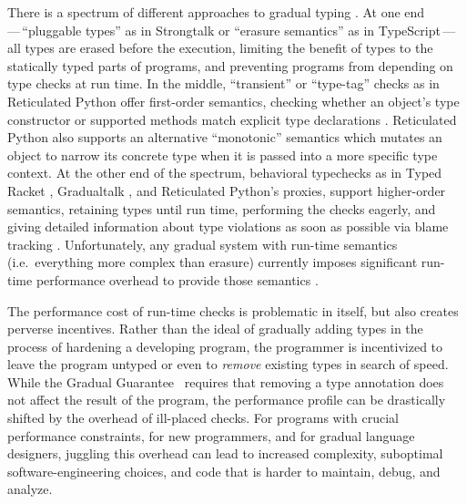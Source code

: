 There is a spectrum of different approaches to gradual typing
\cite{kafka18,bensurvey18icfp}.
At one end\,---\,``pluggable types'' as in Strongtalk \cite{strongtalk} or ``erasure
semantics'' as in 
TypeScript\citep{typeScriptECOOP}\,---\,
%
all types are erased before the execution, limiting the benefit of
types to the statically typed parts of programs, and preventing
programs from depending on type checks at run time.  In the middle,
``transient'' or ``type-tag'' checks as in Reticulated Python 
offer first-order semantics, checking
whether an object's type constructor or supported methods match
explicit type declarations
\cite{Siek2007,Bloom2009,concrete15,reticPython2014,Greenman2018}.
Reticulated Python also supports an alternative ``monotonic'' semantics
which mutates an object to narrow its concrete type when it is passed
into a more specific type context.
At the other end of the spectrum, behavioral
typechecks as in Typed Racket \cite{typedScheme08,takikawa2012},
Gradualtalk \cite{gradualtalk14},
and Reticulated Python's proxies,
support higher-order semantics, retaining
types until run 
time, performing the checks eagerly, and giving detailed information
about type violations as soon as possible via blame
tracking \cite{blame2009,blameForAll2011}.
%
%
Unfortunately, any gradual system with run-time semantics
(i.e.\ everything more complex than erasure) currently
imposes significant run-time performance overhead to provide those semantics
\citep{Takikawa2016,Vitousek2017,Muehlboeck2017,Bauman2017,Richards2017,Stulova2016,Greenman2018}.

The performance cost of run-time checks is problematic in itself,
but also creates perverse incentives. Rather than the ideal of
gradually adding types in the process of hardening a developing
program, the programmer is incentivized to leave the program untyped
or even to \textit{remove} existing types in search of speed.
%
While the Gradual Guarantee~\cite{XXXSiek2015} requires that
removing a type annotation does not affect the result of the
program, the performance profile can be drastically shifted by the
overhead of ill-placed checks.
%
For programs with crucial performance constraints, for new
programmers, and for gradual language designers, juggling this
overhead can lead to increased complexity, suboptimal
software-engineering choices, and code that is harder to maintain,
debug, and analyze.


